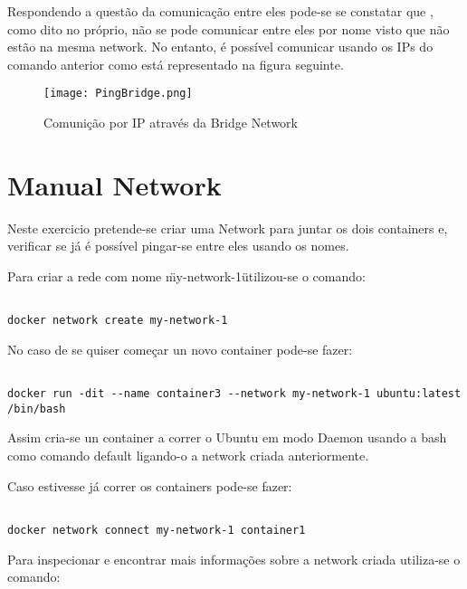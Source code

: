 Respondendo a questão da comunicação entre eles pode-se se constatar que , como dito no próprio, não se pode comunicar entre eles por nome visto que não estão na mesma network. No entanto, é possível comunicar usando os IPs do comando anterior como está representado na figura seguinte.

\begin{figure}[H]

	\centering

 	\texttt{[image: PingBridge.png]}

 	\caption {Comunição por IP através da Bridge Network}

  	\label {fig:Brid}
\end{figure}

\section{Manual Network}

Neste exercicio pretende-se criar uma Network para juntar os dois containers e, verificar se já é possível pingar-se entre eles usando os nomes.

Para criar a rede com nome \"my-network-1\" utilizou-se o comando:

\begin{lstlisting}

docker network create my-network-1

\end{lstlisting}

No caso de se quiser começar un novo container pode-se fazer:

\begin{lstlisting}
	
docker run -dit --name container3 --network my-network-1 ubuntu:latest 
/bin/bash

\end{lstlisting}
	
	Assim cria-se un container a correr o Ubuntu em modo Daemon usando a bash como comando default ligando-o a network criada anteriormente.
	
	Caso estivesse já correr os containers pode-se fazer:

\begin{lstlisting}
	
docker network connect my-network-1 container1

\end{lstlisting}

Para inspecionar e encontrar mais informações sobre a network criada utiliza-se o comando:

